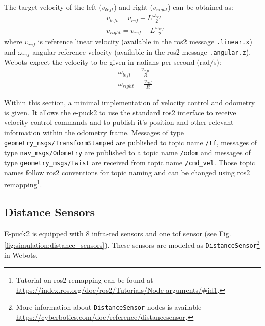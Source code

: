 The target velocity of the left ($v_{left}$) and right ($v_{right}$) can be obtained as:
\begin{equation}
\begin{aligned}
    & v_{left} = v_{ref} + L \frac{\omega_{ref}}{2} \\
    & v_{right} = v_{ref} - L \frac{\omega_{ref}}{2}
\end{aligned}
\end{equation}
where $ v_{ref}  $ is reference linear velocity (available in the \ac{ros2} message \texttt{.linear.x}) and $ \omega_{ref} $ angular reference velocity (available in the \ac{ros2} message \texttt{.angular.z}). Webots expect the velocity to be given in radians per second (rad/s):
\begin{equation}
\begin{aligned}
    & \omega_{left} = \frac{v_{left}}{R} \\
    & \omega_{right} = \frac{v_{ref}}{R} 
\end{aligned}
\end{equation}

Within this section, a minimal implementation of velocity control and odometry is given.
It allows the e-puck2 to use the standard \ac{ros2} interface to receive velocity control commands and to publish it's position and other relevant information within the odometry frame.
Messages of type \texttt{geometry\_msgs/TransformStamped} are published to topic name \texttt{/tf}, messages of type \texttt{nav\_msgs/Odometry} are published to a topic name \texttt{/odom} and messages of type \texttt{geometry\_msgs/Twist} are received from topic name \texttt{/cmd\_vel}.
Those topic names follow \ac{ros2} conventions for topic naming and can be changed using \ac{ros2} remapping\footnote{Tutorial on \ac{ros2} remapping can be found at \url{https://index.ros.org/doc/ros2/Tutorials/Node-arguments/\#id1}.}. 

\subsection{Distance Sensors}
E-puck2 is equipped with 8 infra-red sensors and one \ac{tof} sensor (see Fig. \ref{fig:simulation:distance_sensors}). These sensors are modeled as \texttt{DistanceSensor}\footnote{More information about \texttt{DistanceSensor} nodes is available \url{https://cyberbotics.com/doc/reference/distancesensor}.} in Webots.

